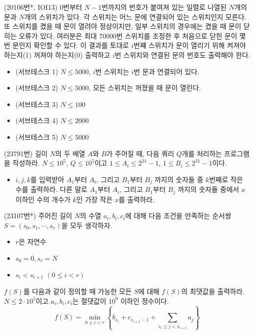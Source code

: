 \begin{problem}
    (20106번*, IOI13) $0$번부터 $N-1$번까지의 번호가 붙여져 있는 일렬로 나열된 $N$개의 문과 $N$개의 스위치가 있다. 각 스위치는 어느 문에 연결되어 있는 스위치인지 모른다. 또 스위치를 켰을 때 문이 열려야 정상이지만, 일부 스위치의 경우에는 켰을 때 문이 닫히는 오류가 있다. 여러분은 최대 $70000$번 스위치를 조정한 후 처음으로 닫힌 문이 몇 번 문인지 확인할 수 있다. 이 결과를 토대로 $i$번쨰 스위치가 문이 열리기 위해 켜져야 하는지(1) 꺼져야 하는지(0) 출력하고 $i$번 스위치와 연결된 문의 번호도 출력해야 한다.
    \begin{itemize}
        \item (서브테스크 1) $N \leq 5000$, $i$번 스위치는 $i$번 문과 연결되어 있다.
        \item (서브테스크 2) $N \leq 5000$, 모든 스위치는 꺼졌을 때 문이 열린다.
        \item (서브테스크 3) $N \leq 100$
        \item (서브테스크 4) $N \leq 2000$
        \item (서브테스크 5) $N \leq 5000$
    \end{itemize}
\end{problem}

\begin{problem}
    (23791번) 길이 $N$의 두 배열 $A$와 $B$가 주어질 때, 다음 쿼리 $Q$개를 처리하는 프로그램을 작성하라. $N \leq 10^5$, $Q \leq 10^5$이고 $1 \leq A_i \leq 2^{31}-1$, $1 \leq B_i \leq 2^{31}-1$이다.
    \begin{itemize}
        \item $i, j, k$를 입력받아 $A_1$부터 $A_i$, 그리고 $B_1$부터 $B_j$ 까지의 숫자들 중 $k$번째로 작은 수를 출력하라. 다른 말로 $A_1$부터 $A_i$, 그리고 $B_1$부터 $B_j$ 까지의 숫자들 중에서 $x$ 이하인 수의 개수가 $k$인 가장 작은 $x$를 출력하라.
    \end{itemize}
\end{problem}

\begin{problem}
    (23107번*) 주어진 길이 $N$의 수열 $a_i, b_i, c_i$에 대해 다음 조건을 만족하는 순서쌍 $S=(s_0, s_1, \cdots, s_r)$을 모두 생각하자.
    \begin{itemize}
        \item $r$은 자연수
        \item $s_0 = 0, s_r = N$
        \item $s_i < s_{i+1}$ $(0 \leq i < r)$
    \end{itemize}
    $f(S)$를 다음과 같이 정의할 때 가능한 모든 $S$에 대해 $f(S)$의 최댓값을 출력하라. $N \leq 2 \cdot 10^5$이고 $a_i, b_i, c_i$는 절댓값이 $10^9$ 이하인 정수이다.
    $$f(S) = \min_{0 \leq i < r} {\left \{ b_{s_i} + c_{s_{i+1} - 1} + \sum_{s_i \leq j < s_{i+1}} {a_j} \right \}}$$
\end{problem}

